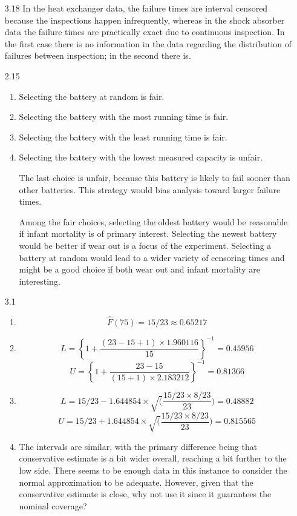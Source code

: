 \documentclass[12pt]{article}\usepackage[]{graphicx}\usepackage[]{color}
\begin{document}
\begin{enumerate}
\item[3.18]
In the heat exchanger data, the failure times are interval censored because the inspections happen infrequently, whereas in the shock absorber data the failure times are practically exact due to continuous inspection.
In the first case there is no information in the data regarding the distribution of failures between inspection; in the second there is.
\item[2.15]
\begin{enumerate}
  \item Selecting the battery at random is fair.
  \item Selecting the battery with the most running time is fair.
  \item Selecting the battery with the least running time is fair.
  \item Selecting the battery with the lowest measured capacity is unfair.
  
  The last choice is unfair, because this battery is likely to fail sooner than other batteries. This strategy would bias analysis toward larger failure times.
  
Among the fair choices, selecting the oldest battery would be reasonable if infant mortality is of primary interest. Selecting the newest battery would be better if wear out is a focus of the experiment. Selecting a battery at random would lead to a wider variety of censoring times and might be a good choice if both wear out and infant mortality are interesting.
\end{enumerate}

\item[3.1]
\begin{enumerate}

  \item
  \[\hat{F}(75) = 15/23 \approx 0.65217\]
  \item
  \[L = \left\{1 + \frac{(23-15+1)\times 1.960116}{15}\right\}^{-1}=0.45956\]
  \[U = \left\{1 + \frac{23-15}{(15+1)\times 2.183212}\right\}^{-1}=0.81366\]
  \item
  \[L = 15/23 - 1.644854 \times \sqrt(\frac{15/23 \times 8/23}{23}) = 0.48882\]
  \[U = 15/23 + 1.644854 \times \sqrt(\frac{15/23 \times 8/23}{23}) = 0.815565\]
  \item
  The intervals are similar, with the primary difference being that conservative estimate is a bit wider overall, reaching a bit further to the low side. There seems to be enough data in this instance to consider the normal approximation to be adequate. However, given that the conservative estimate is close, why not use it since it guarantees the nominal coverage?
\end{enumerate}
\end{enumerate}
\end{document}
